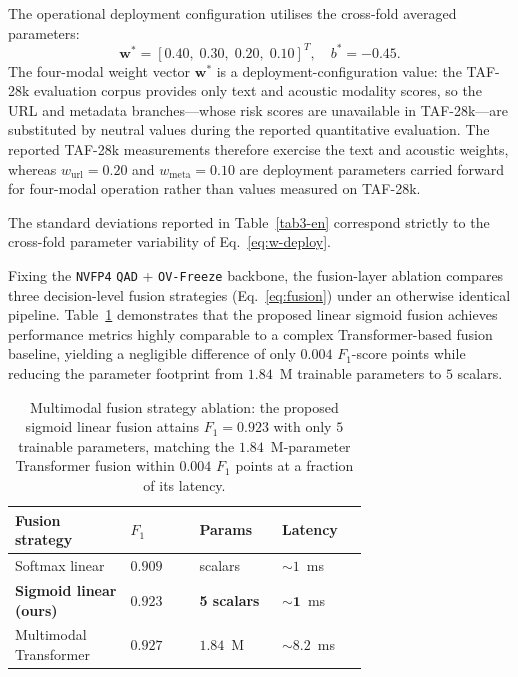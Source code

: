 \documentclass[a4paper,fleqn]{cas-sc}
\begin{document}
The operational deployment configuration utilises the cross-fold averaged parameters:
\begin{equation}
\label{eq:w-deploy}
\mathbf{w}^{*} = [0.40,\; 0.30,\; 0.20,\; 0.10]^{T}, \quad b^{*} = -0.45.
\end{equation}
The four-modal weight vector $\mathbf{w}^{*}$ is a deployment-configuration value: the TAF-28k evaluation corpus provides only text and acoustic modality scores, so the URL and metadata branches---whose risk scores are unavailable in TAF-28k---are substituted by neutral values during the reported quantitative evaluation. The reported TAF-28k measurements therefore exercise the text and acoustic weights, whereas $w_{\mathrm{url}} = 0.20$ and $w_{\mathrm{meta}} = 0.10$ are deployment parameters carried forward for four-modal operation rather than values measured on TAF-28k.

The standard deviations reported in Table~\ref{tab3-en} correspond strictly to the cross-fold parameter variability of Eq.~\eqref{eq:w-deploy}.

Fixing the \texttt{NVFP4} \texttt{QAD} + \texttt{OV-Freeze} backbone, the fusion-layer ablation compares three decision-level fusion strategies (Eq.~\eqref{eq:fusion}) under an otherwise identical pipeline. Table~\ref{tab:fusion_ablation-en} demonstrates that the proposed linear sigmoid fusion achieves performance metrics highly comparable to a complex Transformer-based fusion baseline, yielding a negligible difference of only $0.004$ $F_1$-score points while reducing the parameter footprint from $1.84$~M trainable parameters to $5$ scalars.

\begin{table}
\centering
\caption{Multimodal fusion strategy ablation: the proposed sigmoid linear fusion attains $F_1 = 0.923$ with only $5$ trainable parameters, matching the $1.84$~M-parameter Transformer fusion within $0.004$ $F_1$ points at a fraction of its latency.}
\label{tab:fusion_ablation-en}
\small
\renewcommand{\arraystretch}{1.1}
\begin{tabular}{>{\centering\arraybackslash}p{0.25\linewidth}>{\centering\arraybackslash}p{0.15\linewidth}>{\centering\arraybackslash}p{0.15\linewidth}>{\centering\arraybackslash}p{0.15\linewidth}}
\toprule
\textbf{Fusion strategy} & \textbf{$F_1$} & \textbf{Params} & \textbf{Latency} \\
\midrule
Softmax linear & $0.909$ & 5 scalars & $\sim 1$~ms \\
\textbf{Sigmoid linear (ours)} & $\mathbf{0.923}$ & \textbf{5 scalars} & $\mathbf{\sim 1}$~ms \\
Multimodal Transformer & $0.927$ & $1.84$~M & $\sim 8.2$~ms \\
\bottomrule
\end{tabular}
\end{table}
\end{document}
